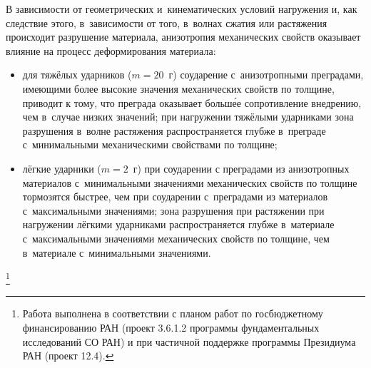 \smallskip

 В зависимости от геометрических и~кинематических условий нагружения и, как следствие этого, в~зависимости от того, в~волнах сжатия или растяжения происходит разрушение материала, анизотропия механических свойств оказывает влияние на процесс деформирования материала:

\begin{itemize}
\item[1)] для тяжёлых ударников ($m=20$~г) соударение с~анизотропными преградами,  имеющими более высокие значения  механических свойств по толщине, приводит к тому, что преграда оказывает больш\'ее сопротивление внедрению, чем в~случае низких значений; при нагружении тяжёлыми ударниками зона разрушения в~волне растяжения распространяется глубже в~преграде с~минимальными механическими свойствами по толщине;

\item[2)]  лёгкие ударники ($m=2$~г) при соударении с преградами из анизотропных материалов с~минимальными значениями механических  свойств по толщине тормозятся быстрее, чем при соударении с~преградами из материалов с~максимальными значениями; зона разрушения при растяжении при нагружении лёгкими ударниками распространяется глубже в~материале с~максимальными значениями механических  свойств по толщине, чем в~материале с~минимальными значениями.


\end{itemize}

\thanks{Работа выполнена в соответствии с планом работ по госбюджетному финансированию РАН (проект 3.6.1.2
 программы фундаментальных исследований СО РАН) и при частичной поддержке программы Президиума РАН (проект 12.4).}



